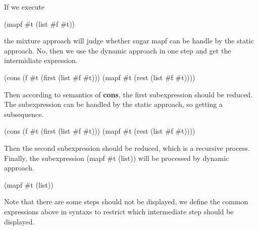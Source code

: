 If we execute 
\begin{Codes}
(mapf \#t (list \#f \#t))
\end{Codes}
 the mixture approach will judge whether sugar mapf can be handle by the static approach. No, then we use the dynamic approach in one step and get the intermidiate expression.
\begin{Codes}
(cons (f \#t (first (list \#f \#t))) (mapf \#t (rest (list \#f \#t))))
\end{Codes}
Then according to semantics of {\bfseries cons}, the first subexpression should be reduced. The subexpression can be handled by the static approach, so getting a subsequence.
\begin{Codes}
	(cons (f \#t (first (list \#f \#t))) (mapf \#t (rest (list \#f \#t))))
\end{Codes}
Then the second subexpression should be reduced, which is a recursive process. Finally, the subexpression (mapf \#t (list)) will be processed by dynamic approach.
\begin{Codes}
	(mapf \#t (list))
\end{Codes}
Note that there are some steps should not be displayed, we define the common expressions above in syntaxs to restrict which intermediate step should be displayed.

